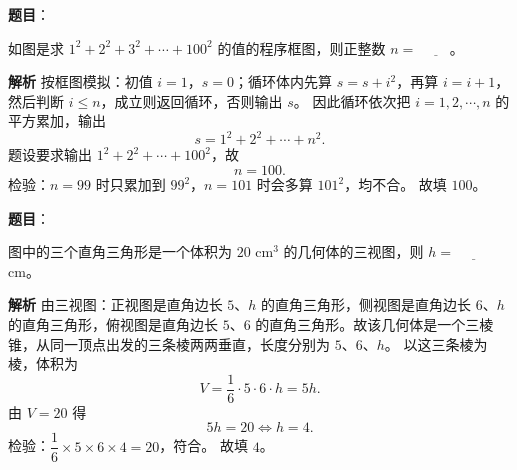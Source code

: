 \begin{answer}

\textbf{题目}：

如图是求 $1^2+2^2+3^2+\cdots+100^2$ 的值的程序框图，则正整数 $n=$ $\underline{\qquad}$。
\nopagebreak[4]
\begin{center}\end{center}
\nopagebreak[4]
\textbf{解析}
按框图模拟：初值 $i=1$，$s=0$；循环体内先算 $s=s+i^2$，再算 $i=i+1$，然后判断 $i\leqslant n$，成立则返回循环，否则输出 $s$。
因此循环依次把 $i=1,2,\cdots,n$ 的平方累加，输出
\nopagebreak[4]
\[s=1^2+2^2+\cdots+n^2.\]
题设要求输出 $1^2+2^2+\cdots+100^2$，故
\nopagebreak[4]
\[n=100.\]
检验：$n=99$ 时只累加到 $99^2$，$n=101$ 时会多算 $101^2$，均不合。
故填 $100$。


\end{answer}
\begin{answer}

\textbf{题目}：

图中的三个直角三角形是一个体积为 $20$ cm$^3$ 的几何体的三视图，则 $h=$ $\underline{\qquad}$ cm。
\nopagebreak[4]
\begin{center}\end{center}
\nopagebreak[4]
\textbf{解析}
由三视图：正视图是直角边长 $5$、$h$ 的直角三角形，侧视图是直角边长 $6$、$h$ 的直角三角形，俯视图是直角边长 $5$、$6$ 的直角三角形。故该几何体是一个三棱锥，从同一顶点出发的三条棱两两垂直，长度分别为 $5$、$6$、$h$。
以这三条棱为棱，体积为
\nopagebreak[4]
\[V=\frac16\cdot5\cdot6\cdot h=5h.\]
由 $V=20$ 得
\nopagebreak[4]
\[5h=20\iff h=4.\]
检验：$\dfrac16\times5\times6\times4=20$，符合。
故填 $4$。


\end{answer}
